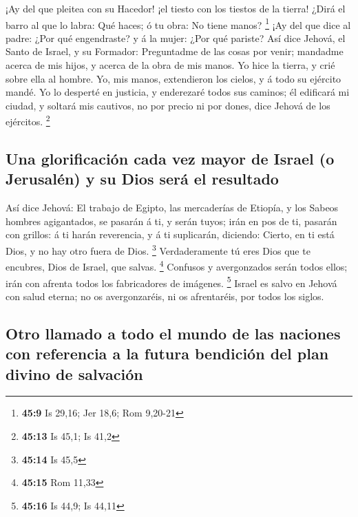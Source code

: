  ¡Ay del que pleitea con su Hacedor! ¡el tiesto con los
tiestos de la tierra! ¿Dirá el barro al que lo labra: Qué haces; ó tu
obra: No tiene manos? \footnote{\textbf{45:9} Is 29,16; Jer 18,6; Rom
  9,20-21}  ¡Ay del que dice al padre: ¿Por qué
engendraste? y á la mujer: ¿Por qué pariste?  Así dice
Jehová, el Santo de Israel, y su Formador: Preguntadme de las cosas por
venir; mandadme acerca de mis hijos, y acerca de la obra de mis manos.
 Yo hice la tierra, y crié sobre ella al hombre. Yo, mis
manos, extendieron los cielos, y á todo su ejército mandé. 
Yo lo desperté en justicia, y enderezaré todos sus caminos; él edificará
mi ciudad, y soltará mis cautivos, no por precio ni por dones, dice
Jehová de los ejércitos. \footnote{\textbf{45:13} Is 45,1; Is 41,2}

\hypertarget{una-glorificaciuxf3n-cada-vez-mayor-de-israel-o-jerusaluxe9n-y-su-dios-seruxe1-el-resultado}{%
\subsection{Una glorificación cada vez mayor de Israel (o Jerusalén) y
su Dios será el
resultado}\label{una-glorificaciuxf3n-cada-vez-mayor-de-israel-o-jerusaluxe9n-y-su-dios-seruxe1-el-resultado}}

 Así dice Jehová: El trabajo de Egipto, las mercaderías de
Etiopía, y los Sabeos hombres agigantados, se pasarán á ti, y serán
tuyos; irán en pos de ti, pasarán con grillos: á ti harán reverencia, y
á ti suplicarán, diciendo: Cierto, en ti está Dios, y no hay otro fuera
de Dios. \footnote{\textbf{45:14} Is 45,5}  Verdaderamente
tú eres Dios que te encubres, Dios de Israel, que salvas. \footnote{\textbf{45:15}
  Rom 11,33}  Confusos y avergonzados serán todos ellos;
irán con afrenta todos los fabricadores de imágenes. \footnote{\textbf{45:16}
  Is 44,9; Is 44,11}  Israel es salvo en Jehová con salud
eterna; no os avergonzaréis, ni os afrentaréis, por todos los siglos.

\hypertarget{otro-llamado-a-todo-el-mundo-de-las-naciones-con-referencia-a-la-futura-bendiciuxf3n-del-plan-divino-de-salvaciuxf3n}{%
\subsection{Otro llamado a todo el mundo de las naciones con referencia
a la futura bendición del plan divino de
salvación}\label{otro-llamado-a-todo-el-mundo-de-las-naciones-con-referencia-a-la-futura-bendiciuxf3n-del-plan-divino-de-salvaciuxf3n}}

